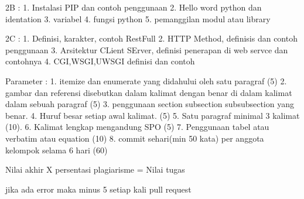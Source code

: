 2B :
1. Instalasi PIP dan contoh penggunaan
2. Hello word python dan identation
3. variabel
4. fungsi python
5. pemanggilan modul atau library

2C :
1. Definisi, karakter, contoh RestFull
2. HTTP Method, definisis dan contoh penggunaan
3. Arsitektur CLient SErver, definisi penerapan di web servce dan contohnya
4. CGI,WSGI,UWSGI definisi dan contoh



Parameter :
1. itemize dan enumerate yang didahului oleh satu paragraf (5)
2. gambar dan referensi disebutkan dalam kalimat dengan benar di dalam kalimat dalam sebuah paragraf (5)
3. penggunaan section subsection subsubsection yang benar. 
4. Huruf besar setiap awal kalimat. (5)
5. Satu paragraf minimal 3 kalimat (10).
6. Kalimat lengkap mengandung SPO (5)
7. Penggunaan tabel atau verbatim atau equation (10)
8. commit sehari(min 50 kata) per anggota kelompok selama 6 hari (60)

Nilai akhir X persentasi plagiarisme = Nilai tugas


jika ada error maka minus 5 setiap kali pull request